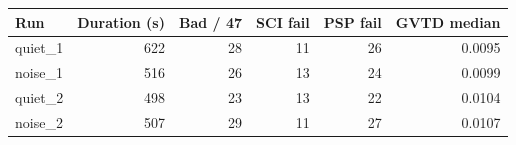 \begin{tabular}{lrrrrr}
\toprule
Run & Duration (s) & Bad / 47 & SCI fail & PSP fail & GVTD median \\
\midrule
quiet\_1 & 622 & 28 & 11 & 26 & 0.0095 \\
noise\_1 & 516 & 26 & 13 & 24 & 0.0099 \\
quiet\_2 & 498 & 23 & 13 & 22 & 0.0104 \\
noise\_2 & 507 & 29 & 11 & 27 & 0.0107 \\
\bottomrule
\end{tabular}
